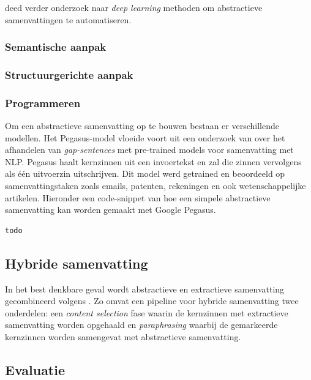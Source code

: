 \textcite{Cao2022} deed verder onderzoek naar \textit{deep learning} methoden om abstractieve samenvattingen te automatiseren. 

\subsubsection{Semantische aanpak}


\subsubsection{Structuurgerichte aanpak}

\subsubsection{Programmeren}

Om een abstractieve samenvatting op te bouwen bestaan er verschillende modellen. Het Pegasus-model vloeide voort uit een onderzoek van \textcite{Zhang2020} over het afhandelen van \textit{gap-sentences} met pre-trained models voor samenvatting met NLP. Pegasus haalt kernzinnen uit een invoertekst en zal die zinnen vervolgens als één uitvoerzin uitschrijven. Dit model werd getrained en beoordeeld op samenvattingstaken zoals emails, patenten, rekeningen en ook wetenschappelijke artikelen. Hieronder een code-snippet van hoe een simpele abstractieve samenvatting kan worden gemaakt met Google Pegasus.

\begin{lstlisting}[language=Python]
todo
\end{lstlisting}


\subsection{Hybride samenvatting}

In het best denkbare geval wordt abstractieve en extractieve samenvatting gecombineerd volgens \textcite{Hsu2018, Huang2019}. Zo omvat een pipeline voor hybride samenvatting twee onderdelen: een \textit{content selection} fase waarin de kernzinnen met extractieve samenvatting worden opgehaald en \textit{paraphrasing} waarbij de gemarkeerde kernzinnen worden samengevat met abstractieve samenvatting. 

\subsection{Evaluatie}

